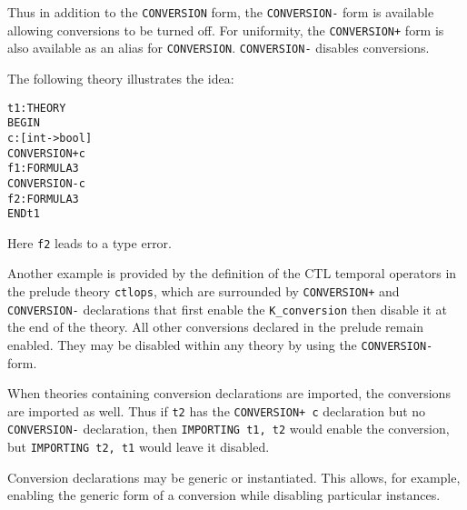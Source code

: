 Thus in addition to the \texttt{CONVERSION} form, the \texttt{CONVERSION-}
form is available allowing conversions to be turned off.  For uniformity,
the \texttt{CONVERSION+} form is also available as an alias for
\texttt{CONVERSION}.  \texttt{CONVERSION-} disables conversions.

The following theory illustrates the idea:
\begin{alltt}
  t1: THEORY
  BEGIN
   c: [int -> bool]
   CONVERSION+ c
   f1: FORMULA 3
   CONVERSION- c
   f2: FORMULA 3
  END t1
\end{alltt}
Here \texttt{f2} leads to a type error.

Another example is provided by the definition of the CTL temporal
operators in the prelude theory \texttt{ctlops}, which are surrounded by
\texttt{CONVERSION+} and \texttt{CONVERSION-} declarations that first
enable the \texttt{K\_conversion} then disable it at the end of the
theory.  All other conversions declared in the prelude remain enabled.
They may be disabled within any theory by using the \texttt{CONVERSION-}
form.

When theories containing conversion declarations are imported, the
conversions are imported as well.  Thus if \texttt{t2} has the
\texttt{CONVERSION+ c} declaration but no \texttt{CONVERSION-}
declaration, then \texttt{IMPORTING t1, t2} would enable the conversion,
but \texttt{IMPORTING t2, t1} would leave it disabled.

Conversion declarations may be generic or instantiated.  This
allows, for example, enabling the generic form of a conversion while
disabling particular instances.

